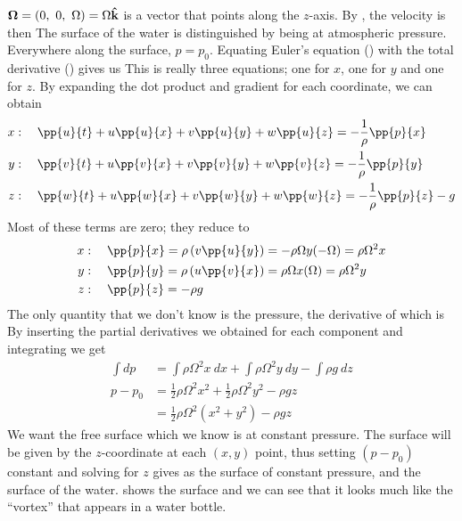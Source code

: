 \documentclass[12pt]{book}
\begin{document}
{
$\boldsymbol \Omega = (0,\ 0,\ \Omega) = \Omega\boldsymbol{\hat{\textbf{k}}}$ is a vector that points along the $z$-axis.  By , the velocity is  then
The surface of the water is distinguished by being at atmospheric pressure. Everywhere along the surface, $p=p_0$.
Equating Euler's equation () with the total derivative () gives us
This is really three equations; one for $x$, one for $y$ and one for $z$.  By expanding the dot product and gradient for each coordinate, we can obtain
\begin{align*}
x&:\quad \pp{u}{t} + u\pp{u}{x} + v\pp{u}{y} + w\pp{u}{z} = -\frac{1}{\rho}\pp{ p}{x}   \\
y&:\quad \pp{v}{t} + u\pp{v}{x} + v\pp{v}{y} + w\pp{v}{z} = -\frac{1}{\rho}\pp{ p}{y}   \\
z&:\quad \pp{w}{t} + u\pp{w}{x} + v\pp{w}{y} + w\pp{w}{z} = -\frac{1}{\rho}\pp{ p}{z} -  g   
\end{align*}
Most of these terms are zero; they reduce to
\begin{align*}
x&:\quad \pp{p}{x} = \rho \left(v \pp{u}{y}\right) = -\rho\Omega y (-\Omega) = \rho\Omega^2x   \\
y&:\quad \pp{p}{y} = \rho \left(u \pp{v}{x}\right) = \rho\Omega x (\Omega) = \rho\Omega^2y   \\
z&:\quad \pp{p}{z} = -\rho g
\end{align*}
The only quantity that we don't know is the pressure, the derivative of which is
By inserting the partial derivatives we obtained for each component and integrating we get
\begin{align*}
\int\!\! dp &= \int\!\!\rho\Omega^2 x\  dx + \int\!\!\rho\Omega^2 y\ dy  -  \int\!\!\rho g\ dz \\
p - p_0 &= \frac{1}{2}\rho \Omega^2 x^2 + \frac{1}{2}\rho \Omega^2 y^2 - \rho g z \\
& = \frac{1}{2}\rho \Omega^2 (x^2 + y^2) - \rho gz
\end{align*}
We want the free surface which we know is at constant pressure. The surface will be given by the $z$-coordinate at each $(x,y)$ point, thus setting $(p-p_0)$ constant and solving for $z$ gives
as the surface of constant pressure, and the surface of the water.   shows  the surface and we can see that it looks much like the ``vortex'' that appears in a water bottle.\nopagebreak
{}

}
\end{document}

